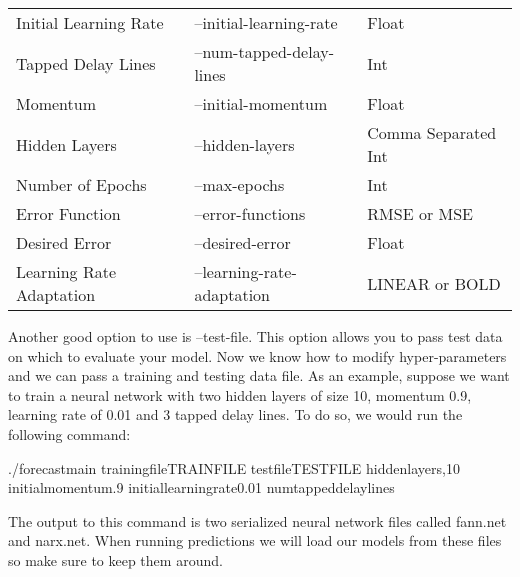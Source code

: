 \documentclass[letterpaper,10pt,english]{sphinxmanual}
\begin{document}
\noindent\begin{tabulary}{\linewidth}{|L|L|L|}
\hline
{}\relax &\relax &\relax \\
\hline
Initial Learning Rate
&
--initial-learning-rate
&
Float
\\
\hline
Tapped Delay Lines
&
--num-tapped-delay-lines
&
Int
\\
\hline
Momentum
&
--initial-momentum
&
Float
\\
\hline
Hidden Layers
&
--hidden-layers
&
Comma Separated Int
\\
\hline
Number of Epochs
&
--max-epochs
&
Int
\\
\hline
Error Function
&
--error-functions
&
\sphinxquotedblleft{}RMSE\sphinxquotedblright{} or \sphinxquotedblleft{}MSE\sphinxquotedblright{}
\\
\hline
Desired Error
&
--desired-error
&
Float
\\
\hline
Learning Rate Adaptation
&
--learning-rate-adaptation
&
\sphinxquotedblleft{}LINEAR\sphinxquotedblright{} or \sphinxquotedblleft{}BOLD\sphinxquotedblright{}
\\
\hline\end{tabulary}


Another good option to use is --test-file. This option allows you to pass test data
on which to evaluate your model. Now we know how to modify hyper-parameters and we can
pass a training and testing data file. As an example, suppose we want to train a neural
network with two hidden layers of size 10, momentum 0.9, learning rate of 0.01 and 3
tapped delay lines. To do so, we would run the following command:

\begin{sphinxVerbatim}[commandchars=\\\{\}]
./forecast\PYGZhy{}main \PYGZhy{}\PYGZhy{}training\PYGZhy{}fileTRAIN\PYGZus{}FILE \PYGZhy{}\PYGZhy{}test\PYGZhy{}fileTEST\PYGZus{}FILE
                \PYGZhy{}\PYGZhy{}hidden\PYGZhy{}layers,10 \PYGZhy{}\PYGZhy{}initial\PYGZhy{}momentum.9 \PYGZhy{}\PYGZhy{}initial\PYGZhy{}learning\PYGZhy{}rate\PYGZhy{}0.01
                \PYGZhy{}\PYGZhy{}num\PYGZhy{}tapped\PYGZhy{}delay\PYGZhy{}lines
\end{sphinxVerbatim}

The output to this command is two serialized neural network files called fann.net and narx.net.
When running predictions we will load our models from these files so make sure to keep them
around.
\end{document}
